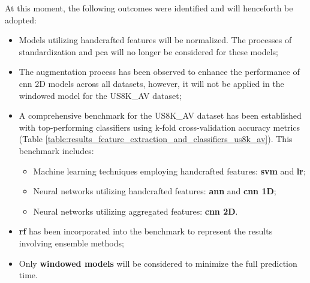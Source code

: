 At this moment, the following outcomes were identified and will henceforth be adopted:
\begin{itemize}
    \item Models utilizing handcrafted features will be normalized. The processes of standardization and \gls{pca} will no longer be considered for these models;
    \item The augmentation process has been observed to enhance the performance of \gls{cnn} 2D models across all datasets, however, it will not be applied in the windowed model for the US8K\_AV dataset;
    \item A comprehensive benchmark for the US8K\_AV dataset has been established with top-performing classifiers using k-fold cross-validation accuracy metrics (Table \ref{table:results_feature_extraction_and_classifiers_us8k_av}). This benchmark includes:
    \begin{itemize}
        \item Machine learning techniques employing handcrafted features: \textbf{\gls{svm}} and \textbf{\gls{lr}};
        \item Neural networks utilizing handcrafted features: \textbf{\gls{ann}} and \textbf{\gls{cnn} 1D};
        \item Neural networks utilizing aggregated features: \textbf{\gls{cnn} 2D}.
    \end{itemize}
    \item \textbf{\gls{rf}} has been incorporated into the benchmark to represent the results involving ensemble methods;
    \item Only \textbf{windowed models} will be considered to minimize the full prediction time.
\end{itemize}


